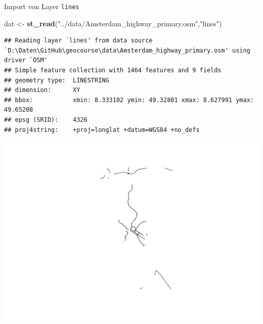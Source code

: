 \documentclass[ignorenonframetext,]{beamer}
\newenvironment{Shaded}{\begin{snugshade}}{\end{snugshade}}
\newcommand{\KeywordTok}[1]{\textcolor[rgb]{0.13,0.29,0.53}{\textbf{#1}}}
\newcommand{\StringTok}[1]{\textcolor[rgb]{0.31,0.60,0.02}{#1}}
\newcommand{\OperatorTok}[1]{\textcolor[rgb]{0.81,0.36,0.00}{\textbf{#1}}}
\newcommand{\NormalTok}[1]{#1}
\begin{document}
\begin{frame}[fragile]{Import von Layer \texttt{lines}}

\begin{Shaded}
\begin{Highlighting}[]
\NormalTok{dat <-}\StringTok{ }\KeywordTok{st_read}\NormalTok{(}\StringTok{"../data/Amsterdam_highway_primary.osm"}\NormalTok{,}\StringTok{"lines"}\NormalTok{)}
\end{Highlighting}
\end{Shaded}

\begin{verbatim}
## Reading layer `lines' from data source `D:\Daten\GitHub\geocourse\data\Amsterdam_highway_primary.osm' using driver `OSM'
## Simple feature collection with 1464 features and 9 fields
## geometry type:  LINESTRING
## dimension:      XY
## bbox:           xmin: 8.333102 ymin: 49.32801 xmax: 8.627991 ymax: 49.65208
## epsg (SRID):    4326
## proj4string:    +proj=longlat +datum=WGS84 +no_defs
\end{verbatim}

\begin{Shaded}
\end{Shaded}

\includegraphics{slides_all2gether_part2_files/figure-beamer/unnamed-chunk-78-1.pdf}

\end{frame}
\end{document}

